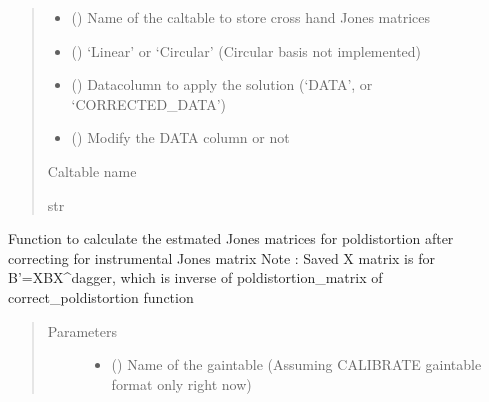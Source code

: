 \documentclass[letterpaper,10pt,english]{sphinxmanual}
\begin{document}
\begin{fulllineitems}
\begin{fulllineitems}
\begin{quote}
\begin{description}
\begin{itemize}
\item {} 
\sphinxAtStartPar
{} () \textendash{} Name of the caltable to store cross hand Jones matrices

\item {} 
\sphinxAtStartPar
{} () \textendash{} ‘Linear’ or ‘Circular’ (Circular basis not implemented)

\item {} 
\sphinxAtStartPar
{} () \textendash{} Datacolumn to apply the solution (‘DATA’, or ‘CORRECTED\_DATA’)

\item {} 
\sphinxAtStartPar
{} () \textendash{} Modify the DATA column or not

\end{itemize}

\item[{Returns}] \leavevmode
\sphinxAtStartPar
Caltable name

\item[{Return type}] \leavevmode
\sphinxAtStartPar
str

\end{description}\end{quote}

\end{fulllineitems}


\begin{fulllineitems}
\label{\detokenize{paircars:paircars.fullpol_selfcal_LTS.PolSelfcal.cal_poldistortion}}
\sphinxAtStartPar
Function to calculate the estmated Jones matrices for poldistortion after correcting for instrumental Jones matrix
Note : Saved X matrix is for B’=XBX\textasciicircum{}dagger, which is inverse of poldistortion\_matrix of correct\_poldistortion function
\begin{quote}\begin{description}
\item[{Parameters}] \leavevmode\begin{itemize}
\item {} 
\sphinxAtStartPar
{} () \textendash{} Name of the gaintable (Assuming CALIBRATE gaintable format only right now)


\end{itemize}
\end{description}
\end{quote}
\end{fulllineitems}
\end{fulllineitems}
\end{document}
